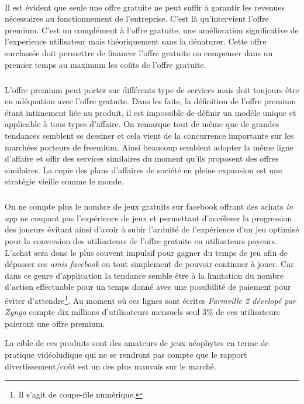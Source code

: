 \documentclass[11pt, a4paper ]{article}
\begin{document}
\begin{spacing}{1.5}
\paragraph{} %
Il est évident que seule une offre gratuite ne peut suffir à garantir les revenues nécessaires au fonctionnement de l'entreprise. C'est là qu'intervient l'offre premium. C'est un complément à l'offre gratuite, une amélioration significative de l'experience utilisateur mais théoriquement sans la dénaturer. Cette offre surclassée doit permettre de financer l'offre gratuite ou compenser dans un premier temps au maximum les coûts de l'offre gratuite.
\subparagraph{}
L'offre premium peut porter sur différents type de services mais doit toujours être en adéquation avec l'offre gratuite. Dans les faits, la définition de l'offre premium étant intimement liée au produit, il est impossible de définir un modèle unique et applicable à tous types d'affaire. On remarque tout de même que de grandes tendances semblent se dessiner et cela vient de la concurrence importante sur les marchées porteurs de freemium. Ainsi beaucoup semblent adopter la même ligne d'affaire et offir des services similaires du moment qu'ils proposent des offres similaires. La copie des plans d'affaires de société en pleine expansion est une stratégie vieille comme le monde.

\subparagraph{} %

On ne compte plus le nombre de jeux gratuits sur facebook offrant des achats \emph{in app} ne coupant pas l'expérience de jeux et permettant d'accélerer la progression des joueurs évitant ainsi d'avoir à subir l'arduité de l'expérience d'un jeu optimisé pour la conversion des utilisateurs de l'offre gratuite en utilisateurs payeurs. L'achat sera donc le plus souvent impulsif pour gagner du temps de jeu afin de dépasser ses \emph{amis facebook} ou tout simplement de pouvoir continuer à jouer. Car dans ce genre d'application la tendance semble être à la limitation du nombre d'action effectuable pour un temps donné avec une possibilité de paiement pour éviter d'attendre\footnote{Il s'agit de coupe-file numérique.}. Au moment où ces lignes sont écrites \emph{Farmville 2 dévelopé par Zynga} compte dix millions d'utilisateurs mensuels seul 3\% de ces utilisateurs paieront une offre premium.


La cible de ces produits sont des amateurs de jeux néophytes en terme de pratique vidéoludique qui ne se rendront pas compte que le rapport divertissement/coût est un des plus mauvais sur le marché.


\end{spacing}
\end{document}
